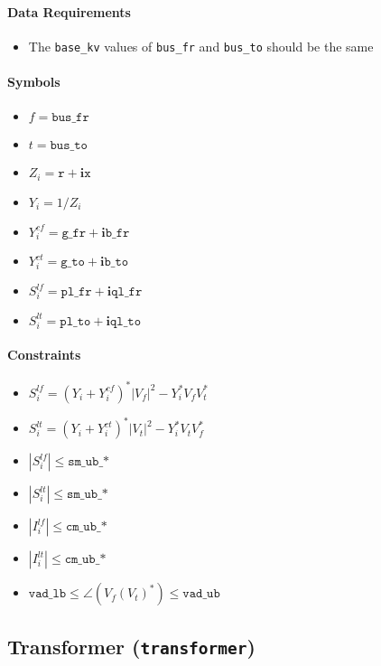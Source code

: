 \documentclass{article}
\begin{document}
\paragraph{Data Requirements}
\begin{itemize}
    \item The \texttt{base\_kv} values of \texttt{bus\_fr} and \texttt{bus\_to} should be the same
\end{itemize}

\paragraph{Symbols}
\begin{itemize}
    \item $f = \texttt{bus\_fr}$
    \item $t = \texttt{bus\_to}$
    \item $Z_i = \texttt{r} + \bm i \texttt{x}$
    \item $Y_i = 1/Z_i$
    \item $Y^{cf}_i = \texttt{g\_fr} + \bm i \texttt{b\_fr}$
    \item $Y^{ct}_i = \texttt{g\_to} + \bm i \texttt{b\_to}$
    \item $S^{lf}_i = \texttt{pl\_fr} + \bm i \texttt{ql\_fr}$
    \item $S^{lt}_i = \texttt{pl\_to} + \bm i \texttt{ql\_to}$
\end{itemize}

\paragraph{Constraints}
\begin{itemize}
    \item $S^{lf}_i = \left(Y_i + Y^{cf}_i\right)^* |V_f|^2 - Y_i^* V_f V^*_t$
    \item $S^{lt}_i = \left(Y_i + Y^{ct}_i\right)^* |V_t|^2 - Y_i^* V_t V^*_f$ 
    \item $|S^{lf}_i| \leq \texttt{sm\_ub\_*}$
    \item $|S^{lt}_i| \leq \texttt{sm\_ub\_*}$
    \item $|I^{lf}_i| \leq \texttt{cm\_ub\_*}$
    \item $|I^{lt}_i| \leq \texttt{cm\_ub\_*}$
    \item $\texttt{vad\_lb} \leq \angle(V_f (V_t)^* ) \leq \texttt{vad\_ub}$
\end{itemize}


\subsection{Transformer (\texttt{transformer})}
\end{document}
